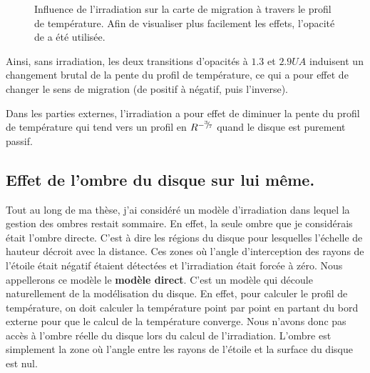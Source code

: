 \begin{figure}[htbp]
\centering
{}\hfill
{}

\caption[Carte de migration avec ou sans irradiation.]{Influence de l'irradiation sur la carte de migration à travers le profil
de température. Afin de visualiser plus
facilement les effets, l'opacité de \cite{bell1994FU} a été utilisée. }\label{fig:irradiation}
\end{figure}

Ainsi, sans irradiation, les deux transitions d'opacités à $1.3$ et $2.9\unit{UA}$ induisent un changement brutal de la pente
du profil de température, ce qui a pour effet de changer le sens de migration (de positif à négatif, puis l'inverse).

Dans les parties externes, l'irradiation a pour effet de diminuer la pente du profil de température qui tend vers un profil en
$R^{-{{}^{3\!\!}/ _{\!7}}}$ quand le disque est purement passif.


\subsection{Effet de l'ombre du disque sur lui même.}\label{sec:shadow}
Tout au long de ma thèse, j'ai considéré un modèle d'irradiation dans lequel la gestion des ombres restait sommaire. En effet, la seule ombre que je considérais était l'ombre directe. C'est à dire les régions du disque pour lesquelles l'échelle de hauteur décroit avec la distance. Ces zones où l'angle d'interception des rayons de l'étoile était négatif étaient détectées et l'irradiation était forcée à zéro. Nous appellerons ce modèle le \textbf{modèle direct}. C'est un modèle qui découle naturellement de la modélisation du disque. En effet, pour calculer le profil de température, on doit calculer la température point par point en partant du bord externe pour que le calcul de la température converge. Nous n'avons donc pas accès à l'ombre réelle du disque lors du calcul de l'irradiation. L'ombre est simplement la zone où l'angle entre les rayons de l'étoile et la surface du disque est nul.

